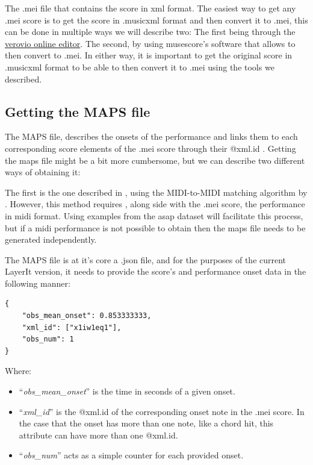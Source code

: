The .mei file that contains the score in xml format. The easiest way to get any .mei score is to get the score in .musicxml format and then convert it to .mei, this can be done in multiple ways we will describe two: The first being through the \href{https://editor.verovio.org/}{verovio online editor}. The second, by using musescore's software that allows to then convert to .mei. In either way, it is important to get the original score in .musicxml format to be able to then convert it to .mei using the tools we described. 

\subsection{Getting the MAPS file}
The MAPS file, describes the onsets of the performance and links them to each corresponding score elements of the .mei score through their @xml.id . Getting the maps file might be a bit more cumbersome, but we can describe two different ways of obtaining it: 

The first is the one described in \cite{goeblLetsScoreWarpAgain2025a}, using the MIDI-to-MIDI matching algorithm by \cite{nakamuraPERFORMANCEERRORDETECTION}. However,  this method requires , along side with the .mei score, the performance in midi format. Using examples from the asap dataset \cite{peterAutomaticNoteLevelScoretoPerformance2023} will facilitate this process, but if a midi performance is not possible to obtain then the maps file needs to be generated independently.

The MAPS file is at it's core a .json file, and for the purposes of the current LayerIt version, it needs to provide the score's and performance onset data in the following manner:

\begin{lstlisting}[caption={Minimal structure of the MAPS.json file to work with LayerIt and ScoreWarp},label={lst:simple-MAPS-example}]
{
    "obs_mean_onset": 0.853333333,
    "xml_id": ["x1iw1eq1"],
    "obs_num": 1
}
\end{lstlisting}

\noindent Where: 

\begin{itemize}
    \item ``\textit{obs\_mean\_onset}'' is the time in seconds of a given onset.
    \item ``\textit{xml\_id}'' is the @xml.id of the corresponding onset note in the .mei score. In the case that the onset has more than one note, like a chord hit, this attribute can have more than one @xml.id. 
    \item ``\textit{obs\_num}'' acts as a simple counter for each provided onset. 
\end{itemize} 

